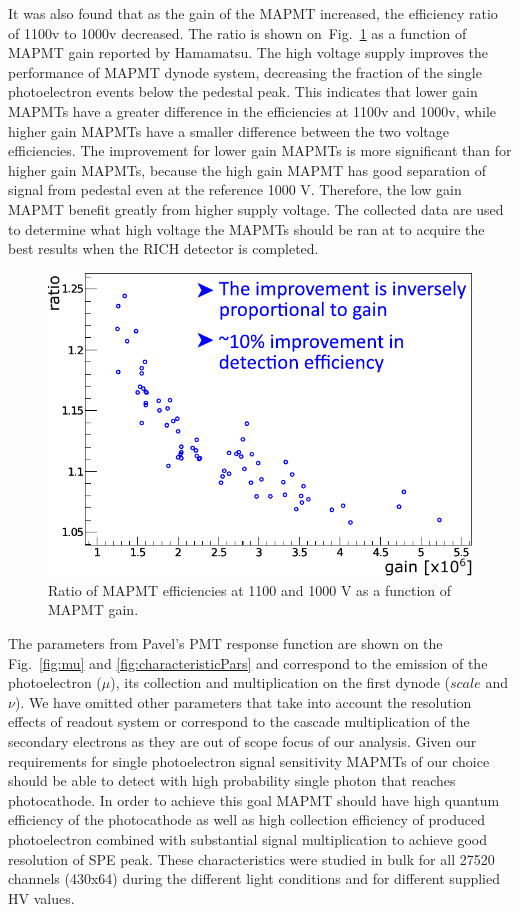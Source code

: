 It was also found that as the gain of the MAPMT increased, the efficiency ratio of 1100v to 1000v decreased.
The ratio is shown on~Fig.~\ref{fig:effratio} as a function of MAPMT gain reported by Hamamatsu.
The high voltage supply improves the performance of MAPMT dynode system, decreasing the fraction of the single photoelectron events below the pedestal peak.
This indicates that lower gain MAPMTs have a greater difference in the efficiencies at 1100v and 1000v, while higher gain MAPMTs have a smaller difference between the two voltage efficiencies.
The improvement for lower gain MAPMTs is more significant than for higher gain MAPMTs, because the high gain MAPMT has good separation of signal from pedestal even at the reference 1000 V.
Therefore, the low gain MAPMT benefit greatly from higher supply voltage.
The collected data are used to determine what high voltage the MAPMTs should be ran at to acquire the best results when the RICH detector is completed.


\begin{figure}[ht]
	\centering
	\includegraphics[width=0.8\linewidth]{figures/effratio.pdf}
	\caption{Ratio of MAPMT efficiencies at 1100 and 1000 V as a function of MAPMT gain.}
	\label{fig:effratio}
\end{figure}

The parameters from Pavel's PMT response function are shown on the Fig.~\ref{fig:mu} and \ref{fig:characteristicPars} and correspond to the emission of the photoelectron ($\mu$), its collection and multiplication on the first dynode ($scale$ and $\nu$).
We have omitted other parameters that take into account the resolution effects of readout system or correspond to the cascade multiplication of the secondary electrons as they are out of scope focus of our analysis.
Given our requirements for single photoelectron signal sensitivity MAPMTs of our choice should be able to detect with high probability single photon that reaches photocathode.
In order to achieve this goal MAPMT should have high quantum efficiency of the photocathode as well as high collection efficiency of produced photoelectron combined with substantial signal multiplication to achieve good resolution of SPE peak.
These characteristics were studied in bulk for all 27520 channels (430x64) during the different light conditions and for different supplied HV values.

